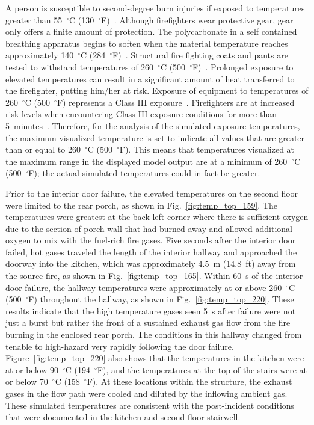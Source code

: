 \documentclass[12pt,oneside]{book}
\begin{document}
A person is susceptible to second-degree burn injuries if exposed to temperatures greater than 55~$^{\circ}$C (130~$^{\circ}$F)~\cite{contactburn}. Although firefighters wear protective gear, gear only offers a finite amount of protection. The polycarbonate in a self contained breathing apparatus begins to soften when the material temperature reaches approximately 140~$^{\circ}$C (284~$^{\circ}$F)~\cite{mensch2011emergency}. Structural fire fighting coats and pants are tested to withstand temperatures of 260~$^{\circ}$C (500~$^{\circ}$F)~\cite{nfpa2013standard}. Prolonged exposure to elevated temperatures can result in a significant amount of heat transferred to the firefighter, putting him/her at risk. Exposure of equipment to temperatures of 260~$^{\circ}$C (500~$^{\circ}$F) represents a Class III exposure~\cite{Donnelly2006}. Firefighters are at increased risk levels when encountering Class III exposure conditions for more than 5~minutes~\cite{Donnelly2006}. Therefore, for the analysis of the simulated exposure temperatures, the maximum visualized temperature is set to indicate all values that are greater than or equal to 260~$^{\circ}$C (500~$^{\circ}$F). This means that temperatures visualized at the maximum range in the displayed model output are at a minimum of 260~$^{\circ}$C (500~$^{\circ}$F); the actual simulated temperatures could in fact be greater. 

Prior to the interior door failure, the elevated temperatures on the second floor were limited to the rear porch, as shown in Fig.~\ref{fig:temp_top_159}. The temperatures were greatest at the back-left corner where there is sufficient oxygen due to the section of porch wall that had burned away and allowed additional oxygen to mix with the fuel-rich fire gases. Five seconds after the interior door failed, hot gases traveled the length of the interior hallway and approached the doorway into the kitchen, which was approximately 4.5~m (14.8~ft) away from the source fire, as shown in Fig.~\ref{fig:temp_top_165}. Within 60~s of the interior door failure, the hallway temperatures were approximately at or above 260~$^{\circ}$C (500~$^{\circ}$F) throughout the hallway, as shown in Fig.~\ref{fig:temp_top_220}. These results indicate that the high temperature gases seen 5~s after failure were not just a burst but rather the front of a sustained exhaust gas flow from the fire burning in the enclosed rear porch. The conditions in this hallway changed from tenable to high-hazard very rapidly following the door failure. Figure~\ref{fig:temp_top_220} also shows that the temperatures in the kitchen were at or below 90~$^{\circ}$C (194~$^{\circ}$F), and the temperatures at the top of the stairs were at or below 70~$^{\circ}$C (158~$^{\circ}$F). At these locations within the structure, the exhaust gases in the flow path were cooled and diluted by the inflowing ambient gas. These simulated temperatures are consistent with the post-incident conditions that were documented in the kitchen and second floor stairwell.
\end{document}
